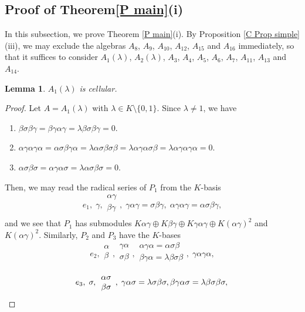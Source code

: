 \documentclass[12pt]{amsart}
\newtheorem{lem}[thm]{Lemma}
\numberwithin{equation}{thm}
\begin{document}
{\subsection{Proof of Theorem\;\ref{P main}\;(i)}
In this subsection, we prove Theorem \ref{P main}(i).
By Proposition \ref{C Prop simple}(iii), we may exclude the 
algebras $A_8$, $A_9$, $A_{10}$, $A_{12}$, $A_{15}$ and $A_{16}$ 
immediately, so that it suffices to consider 
$A_1(\lambda)$, $A_2(\lambda)$, $A_3$, $A_4$, $A_5$, $A_6$, $A_7$, $A_{11}$, $A_{13}$ and $A_{14}$.
\begin{lem}
\label{P A1}
$A_1(\lambda)$ is cellular.
\end{lem}
\begin{proof}
Let $A=A_1(\lambda)$ with $\lambda\in K\setminus\{0,1\}$.
Since $\lambda\neq 1$, we have 
\begin{enumerate}
\item $\beta\sigma\beta\gamma=\beta\gamma\alpha\gamma=\lambda\beta\sigma\beta\gamma=0.$
\item $\alpha\gamma\alpha\gamma\alpha=\alpha\sigma\beta\gamma\alpha=\lambda\alpha\sigma\beta\sigma\beta=\lambda\alpha\gamma\alpha\sigma\beta=\lambda\alpha\gamma\alpha\gamma\alpha=0.$
\item $\alpha\sigma\beta\sigma=\alpha\gamma\alpha\sigma=\lambda\alpha\sigma\beta\sigma=0.$
\end{enumerate}
Then, we may read the radical series of $P_1$ from the $K$-basis
\[e_1, \; \gamma, 
\begin{array}{cc}
 \alpha\gamma\\
 \beta\gamma\\
\end{array},\;
\gamma\alpha\gamma=\sigma\beta\gamma,\;
 \alpha\gamma\alpha\gamma=\alpha\sigma\beta\gamma,
  \]
and we see that $P_1$ has submodules 
$K\alpha\gamma\oplus K\beta\gamma\oplus K\gamma\alpha\gamma\oplus K(\alpha\gamma)^2$ 
and $K(\alpha\gamma)^2$. Similarly, $P_2$ and $P_3$ have the $K$-bases
\[e_2, 
\begin{array}{cc}
 \alpha\\ 
 \beta\\
\end{array}, 
\begin{array}{cc}
 \gamma\alpha\\
 \sigma\beta\\
\end{array},
\begin{array}{cc} 
  \alpha\gamma\alpha=\alpha\sigma\beta\\
  \beta\gamma\alpha=\lambda\beta\sigma\beta\\
\end{array},\;  
\gamma\alpha\gamma\alpha,
\]
\[e_3,\; \sigma, 
\begin{array}{cc}
 \alpha\sigma\\
 \beta\sigma\\
\end{array},\;
\gamma\alpha\sigma=\lambda\sigma\beta\sigma,
 \beta\gamma\alpha\sigma=\lambda\beta\sigma\beta\sigma,\\
\]


\end{proof}}
\end{document}

